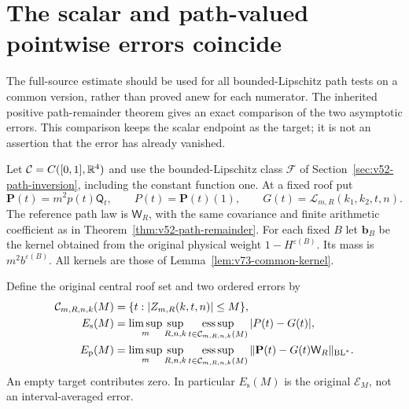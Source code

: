 \section{The scalar and path-valued pointwise errors coincide}
\label{sec:v73-scalar-path}
The full-source estimate should be used for all bounded-Lipschitz
path tests on a common version, rather than proved anew for each
numerator. The inherited positive path-remainder theorem gives an
exact comparison of the two asymptotic errors. This comparison keeps
the scalar endpoint as the target; it is not an assertion that the
error has already vanished.

Let $\mathcal C=C([0,1],\mathbb R^4)$ and use the bounded-Lipschitz class
$\mathcal F$ of Section~\ref{sec:v52-path-inversion}, including the
constant function one. At a fixed roof put
\[
 \mathbf P(t)=m^2p(t)\mathsf Q_t,\qquad P(t)=\mathbf P(t)(1),
 \qquad G(t)=\mathcal L_{m,R}(k_1,k_2,t,n).
\]
The reference path law is $\mathsf W_R$, with the same covariance
and finite arithmetic coefficient as in
Theorem~\ref{thm:v52-path-remainder}. For each fixed $B$ let
$\mathbf b_B$ be the kernel obtained from the original physical
weight $1-H^{\varepsilon(B)}$. Its mass is $m^2b^{\varepsilon(B)}$.
All kernels are those of Lemma~\ref{lem:v73-common-kernel}.

Define the original central roof set and two ordered errors by
\begin{align}
 \mathcal C_{m,R,n,k}(M)&=\{t:|Z_{m,R}(k,t,n)|\le M\},\notag\\
 E_{\mathrm s}(M)&=\limsup_m\sup_{R,n,k}
       \operatorname*{ess\,sup}_{t\in\mathcal C_{m,R,n,k}(M)}
                                |P(t)-G(t)|,\notag\\
 E_{\mathrm p}(M)&=\limsup_m\sup_{R,n,k}
       \operatorname*{ess\,sup}_{t\in\mathcal C_{m,R,n,k}(M)}
                       \|\mathbf P(t)-G(t)\mathsf W_R\|_{\mathrm{BL}^*}.
                                                   \label{eq:v73-errors}
\end{align}
An empty target contributes zero. In particular $E_{\mathrm s}(M)$
is the original $\mathcal E_M$, not an interval-averaged error.

